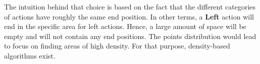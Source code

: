 \documentclass{llncs}
\begin{document}
The intuition behind that choice is based on the fact that the different categories of actions have roughly the same end position. In other terms, a \textbf{Left} action will end in the specific area for left actions. Hence, a large amount of space will be empty and will not contain any end positions. The points distribution would lead to focus on finding areas of high density. For that purpose, density-based algorithms exist.





%




\end{document}
